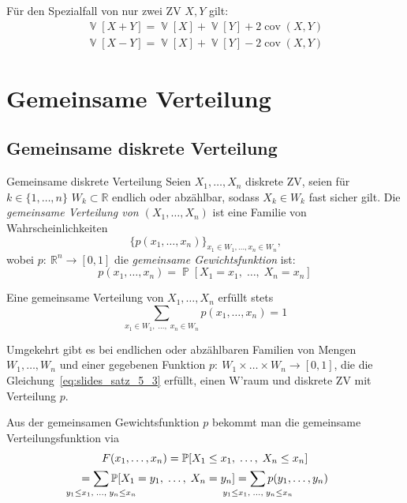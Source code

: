 \documentclass[a4paper,10pt]{article}
\def\R{\mathbb{R}}
\renewcommand{\P}{\operatorname{\mathbb{P}}}
\DeclareMathOperator{\V}{\mathbb{V}}
\DeclareMathOperator{\cov}{cov}
\numberwithin{equation}{section}
\begin{document}
Für den Spezialfall von nur zwei ZV \( X, Y \) gilt:
\begin{gather*}
    \V[X + Y] = \V[X] + \V[Y] + 2 \cov(X, Y) \\
    \V[X - Y] = \V[X] + \V[Y] - 2 \cov(X, Y)
\end{gather*}

\section{Gemeinsame Verteilung}

\subsection{Gemeinsame diskrete Verteilung}

\begin{mainbox}{Gemeinsame diskrete Verteilung}
    Seien \( X_1, \dots, X_n \) diskrete ZV, seien für \( k \in \{1, \dots, n\} \) \( W_k \subset \R \) endlich oder abzählbar, sodass \( X_k \in W_k \) fast sicher gilt.
    Die \emph{gemeinsame Verteilung von \( (X_1, \dots, X_n) \)} ist eine Familie von Wahrscheinlichkeiten
    \[
        \{p(x_1, \dots, x_n)\}_{x_1 \in W_1, \dots, x_n \in W_n} \text{,}
    \]
    wobei \( p: \: \R^n \to [0, 1] \) die \emph{gemeinsame Gewichtsfunktion} ist:
    \[
        p(x_1, \dots, x_n) = \P[X_1 = x_1, \; \dots, \; X_n = x_n]
    \]
\end{mainbox}

\begin{mainbox}{}
    Eine gemeinsame Verteilung von \( X_1, \dots, X_n \) erfüllt stets
    \begin{equation}
        \sum_{x_1 \in W_1, \; \dots, \; x_n \in W_n} p(x_1, \dots, x_n) = 1
        \label{eq:slides_satz_5_3}
    \end{equation}
\end{mainbox}

Umgekehrt gibt es bei endlichen oder abzählbaren Familien von Mengen \( W_1, \dots, W_n \) und einer gegebenen Funktion \( p: \: W_1 \times \dots \times W_n \to [0, 1] \), die die Gleichung~\eqref{eq:slides_satz_5_3} erfüllt, einen W'raum und diskrete ZV mit Verteilung \( p \).

\begin{subbox}{}
    Aus der gemeinsamen Gewichtsfunktion \( p \) bekommt man die gemeinsame Verteilungsfunktion via
    \begin{multline*}
        F(x_1, \dots, x_n)
        = \P[X_1 \leq x_1, \; \dots, \; X_n \leq x_n] \\
        = \sum_{\mathclap{y_1 \leq x_1, \; \dots, \; y_n \leq x_n}} \P[X_1 = y_1, \; \dots, \; X_n = y_n ]
        = \sum_{\mathclap{y_1 \leq x_1, \; \dots, \; y_n \leq x_n}} p(y_1, \dots, y_n)
    \end{multline*}
\end{subbox}
\end{document}
